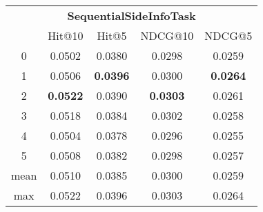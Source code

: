 \documentclass{article}
\begin{document}
 

\begin{tabular}{c|cccc}

\multicolumn{5}{c}{\textbf{SequentialSideInfoTask}} \\
\noalign{\smallskip}
\noalign{\smallskip}
\toprule
\multicolumn{1}{c}{Template ID} & \multicolumn{1}{|c}{Hit@10} & \multicolumn{1}{c}{Hit@5} & \multicolumn{1}{c}{NDCG@10} & \multicolumn{1}{c}{NDCG@5} \\
\midrule
0 & 0.0502 & 0.0380 & 0.0298 & 0.0259 \\
1 & 0.0506 & \textbf{0.0396} & 0.0300 & \textbf{0.0264} \\
2 & \textbf{0.0522} & 0.0390 & \textbf{0.0303} & 0.0261 \\
3 & 0.0518 & 0.0384 & 0.0302 & 0.0258 \\
4 & 0.0504 & 0.0378 & 0.0296 & 0.0255 \\
5 & 0.0508 & 0.0382 & 0.0298 & 0.0257 \\
\midrule
mean & 0.0510 & 0.0385 & 0.0300 & 0.0259 \\
max & 0.0522 & 0.0396 & 0.0303 & 0.0264 \\
\bottomrule

\end{tabular}
\end{document}
